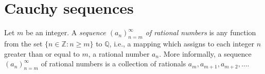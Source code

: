 \section{Cauchy sequences}

\begin{definition}[Sequences]\label{5.1.1}
Let \(m\) be an integer.
A \emph{sequence \((a_n)_{n = m}^{\infty}\) of rational numbers} is any function from the set \(\{n \in \mathds{Z} : n \geq m\}\) to \(\mathds{Q}\), i.e., a mapping which assigns to each integer \(n\) greater than or equal to \(m\), a rational number \(a_n\).
More informally, a sequence \((a_n)_{n = m}^{\infty}\) of rational numbers is a collection of rationals \(a_m, a_{m + 1}, a_{m + 2}, \dots\).
\end{definition}